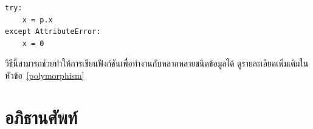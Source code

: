 
\begin{verbatim}
try:
    x = p.x
except AttributeError:
    x = 0
\end{verbatim}


วิธีนี้สามารถช่วยทำให้การเขียนฟังก์ชันเพื่อทำงานกับหลากหลายชนิดข้อมูลได้ ดูรายละเอียดเพิ่มเติมในหัวข้อ~\ref{polymorphism} 

\section{อภิธานศัพท์}

